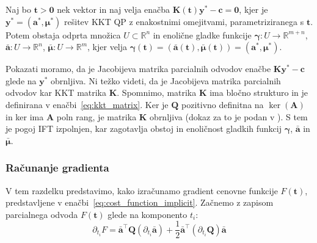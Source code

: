 \documentclass[isrm2, tisk]{fmfdelo}
\newcommand{\aimplicit}{\bar{\mathbf{a}}}
\newcommand{\muimplicit}{\bar{\boldsymbol{\mu}}}
\newcommand{\yimplicit}{\mathbf{\gamma}}
\newcommand{\qmat}{\mathbf{Q}}
\newcommand{\amat}{\mathbf{A}}
\newcommand{\kmat}{\mathbf{K}}
\newcommand{\avec}{\mathbf{a}}
\newcommand{\tvec}{\mathbf{t}}
\newcommand{\muvec}{\boldsymbol{\mu}}
\begin{document}
\begin{izrek} 
Naj bo $\tvec > \mathbf{0}$ nek vektor in naj velja enačba $\kmat(\tvec)\mathbf{y}^* - \mathbf{c} = \mathbf{0}$, kjer je $\mathbf{y}^* = (\avec^*, \muvec^*)$ rešitev \ac{KKT} \ac{QP} z enakostnimi omejitvami, parametriziranega s $\tvec$. Potem obstaja odprta množica $U \subset \mathbb{R}^n$ in enolične gladke funkcije $\yimplicit : U \to \mathbb{R}^{m+n}$, $\aimplicit : U \to \mathbb{R}^{n}$, $\muimplicit : U \to \mathbb{R}^{m}$, kjer velja $\yimplicit(\tvec) = (\aimplicit(\tvec), \muimplicit(\tvec)) = (\avec^*, \muvec^*)$.
\end{izrek}

\begin{dokaz}
Pokazati moramo, da je Jacobijeva matrika parcialnih odvodov enačbe \newline $\kmat \mathbf{y}^* - \mathbf{c}$ glede na $\mathbf{y}^*$ obrnljiva. Ni težko videti, da je Jacobijeva matrika parcialnih odvodov kar \acs{KKT} matrika $\mathbf{K}$. Spomnimo, matrika $\kmat$ ima bločno strukturo in je definirana v enačbi~\eqref{eq:kkt_matrix}. Ker je $\mathbf{Q}$ pozitivno definitna na $\ker(\amat)$ in ker ima $\mathbf{A}$ poln rang, je matrika $\mathbf{K}$ obrnljiva (dokaz za to je podan v \cite{EPFL_Part5}). S tem je pogoj \ac{IFT} izpolnjen, kar zagotavlja obstoj in enoličnost gladkih funkcij $\yimplicit$, $\aimplicit$ in $\muimplicit$.
\end{dokaz}

\subsubsection{Računanje gradienta}
\label{sec:grad}

V tem razdelku predstavimo, kako izračunamo gradient cenovne funkcije $F(\tvec)$, predstavljene v enačbi~\eqref{eq:cost_function_implicit}. Začnemo z zapisom parcialnega odvoda $F(\tvec)$ glede na komponento $t_i$:
\begin{equation}
    \label{eq:grad}
    \partial_{t_i} F = \aimplicit^\top \qmat (\partial_{t_i} \aimplicit) + \frac{1}{2} \aimplicit^\top (\partial_{t_i} \qmat) \aimplicit
\end{equation}
\end{document}
